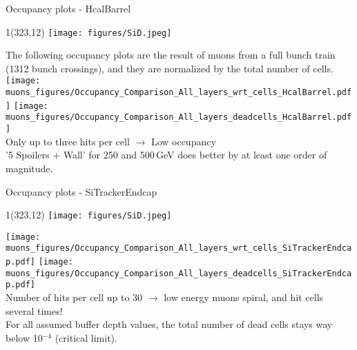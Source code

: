 \documentclass[xcolor={dvipsnames}]{beamer}
\newcommand{\sidlogo}{
  \setlength{\TPHorizModule}{1pt}
  \setlength{\TPVertModule}{1pt}
  \begin{textblock}{1}(323,12)
   \texttt{[image: figures/SiD.jpeg]}
  \end{textblock}
  }
\begin{document}
\begin{frame}{Occupancy plots - \small HcalBarrel}
\sidlogo
{\footnotesize The following occupancy plots are the result of muons from a \alert{full bunch train (1312 bunch crossings)}, and they are normalized by the total number of cells.}\\\vspace*{0.1cm}
\texttt{[image: muons\_figures/Occupancy\_Comparison\_All\_layers\_wrt\_cells\_HcalBarrel.pdf]}\hfill
\texttt{[image: muons\_figures/Occupancy\_Comparison\_All\_layers\_deadcells\_HcalBarrel.pdf]}\\
\vspace*{0.2cm}
Only up to three hits per cell $\rightarrow$ Low occupancy
\\'5 Spoilers + Wall' for 250 and 500\,GeV does better by at least one order of magnitude.
\end{frame}

\begin{frame}{Occupancy plots - \small SiTrackerEndcap}
\sidlogo
\texttt{[image: muons\_figures/Occupancy\_Comparison\_All\_layers\_wrt\_cells\_SiTrackerEndcap.pdf]}\hfill
\texttt{[image: muons\_figures/Occupancy\_Comparison\_All\_layers\_deadcells\_SiTrackerEndcap.pdf]}\\
Number of hits per cell up to 30 $\rightarrow$ low energy muons spiral, and hit cells several times!
\\For all assumed buffer depth values, the total number of dead cells stays way below 10$^{-4}$ (critical limit).
\end{frame}
\end{document}
